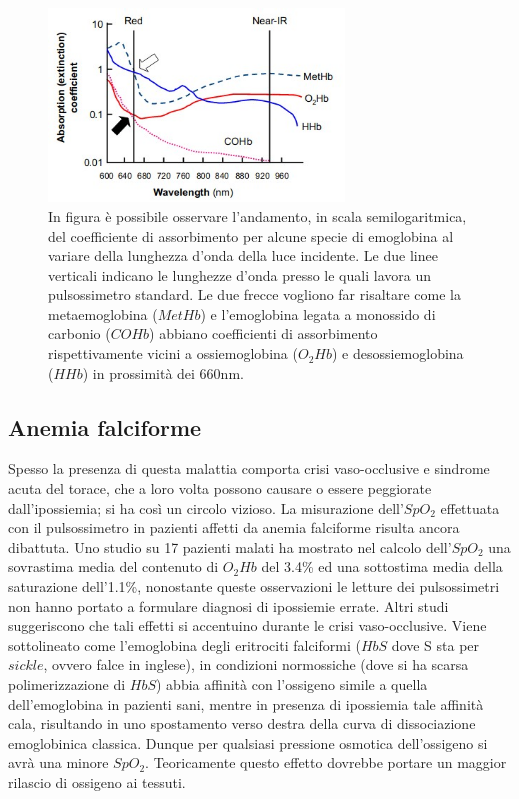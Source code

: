 \documentclass[a4paper, 12pt]{book}
\begin{document}
\begin{figure}[h!]
    \centering
    \includegraphics[width=0.7\textwidth]{multidiss.jpg}
    \caption{In figura è possibile osservare l'andamento, in scala semilogaritmica, del 			 coefficiente di assorbimento per alcune specie di emoglobina al variare 					 della lunghezza d'onda della luce incidente.
  		     Le due linee verticali indicano le lunghezze d'onda presso le quali lavora 			 un pulsossimetro standard.
 		     Le due frecce vogliono far risaltare come la metaemoglobina ($MetHb$) e 					 l'emoglobina legata a monossido di carbonio ($COHb$) abbiano coefficienti 					 di assorbimento rispettivamente vicini a ossiemoglobina ($O_2Hb$) e 						 desossiemoglobina ($HHb$) in prossimità dei 660nm.}
    \label{fig:multidissociation}
\end{figure}


\subsection{Anemia falciforme}

Spesso la presenza di questa malattia comporta crisi vaso-occlusive e sindrome acuta del torace, che a loro volta possono causare o essere peggiorate dall'ipossiemia; si ha così un circolo vizioso.
La misurazione dell'$SpO_2$ effettuata con il pulsossimetro in pazienti affetti da anemia falciforme risulta ancora dibattuta.
Uno studio su 17 pazienti malati ha mostrato nel calcolo dell'$SpO_2$ una sovrastima media del contenuto di $O_2Hb$ del 3.4\% ed una sottostima media della saturazione dell'1.1\%, nonostante queste osservazioni le letture dei pulsossimetri non hanno portato a formulare diagnosi di ipossiemie errate.%
Altri studi suggeriscono che tali effetti si accentuino durante le crisi vaso-occlusive.
Viene sottolineato come l'emoglobina degli eritrociti falciformi ($HbS$ dove S sta per $sickle$, ovvero falce in inglese), in condizioni normossiche (dove si ha scarsa polimerizzazione di $HbS$) abbia affinità con l'ossigeno simile a quella dell'emoglobina in pazienti sani, mentre in presenza di ipossiemia tale affinità cala, risultando in uno spostamento verso destra della curva di dissociazione emoglobinica classica.
Dunque per qualsiasi pressione osmotica dell'ossigeno si avrà una minore $SpO_2$. Teoricamente questo effetto dovrebbe portare un maggior rilascio di ossigeno ai tessuti.
\end{document}
